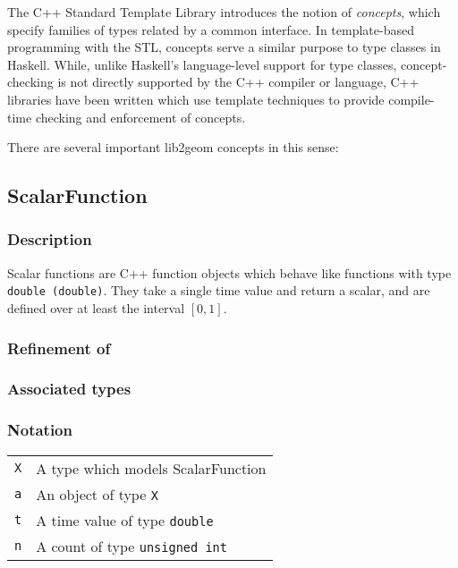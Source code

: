 \documentclass{book}
\begin{document}
The C++ Standard Template Library\cite{stl} introduces the notion of
\emph{concepts}\cite{stl_concepts}, which specify families of types related
by a common interface.  In template-based programming with the STL, concepts
serve a similar purpose to type classes in Haskell.  While, unlike Haskell's
language-level support for type classes, concept-checking is not directly
supported by the C++ compiler or language, C++ libraries have been written
which use template techniques to provide compile-time checking and enforcement
of concepts\cite{boost_concept_check}.

There are several important lib2geom concepts in this sense:

\subsection{ScalarFunction}

\subsubsection{Description}

Scalar functions are C++ function objects which behave like functions
with type {\tt double (double)}.  They take a single time value and return
a scalar, and are defined over at least the interval $[0, 1]$.

\subsubsection{Refinement of}

\subsubsection{Associated types}

\subsubsection{Notation}

\begin{tabular}{r l}
  {\tt X} & A type which models ScalarFunction \\
  {\tt a} & An object of type {\tt X} \\
  {\tt t} & A time value of type {\tt double} \\
  {\tt n} & A count of type {\tt unsigned int} \\
\end{tabular}
\end{document}
